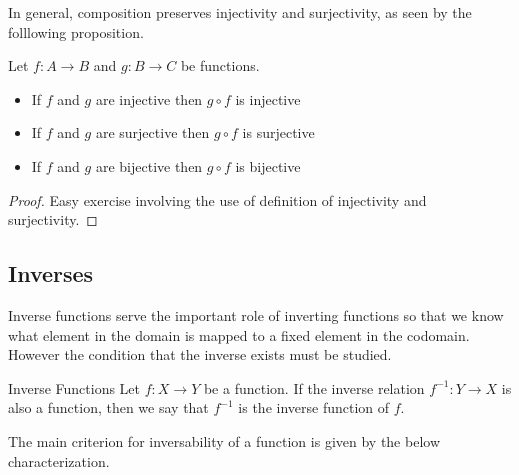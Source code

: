 \documentclass[a4paper]{article}
\begin{document}
In general, composition preserves injectivity and surjectivity, as seen by the folllowing proposition. 

\begin{prp}{}{} Let $f:A\to B$ and $g:B\to C$ be functions. 
\begin{itemize}
\item If $f$ and $g$ are injective then $g\circ f$ is injective
\item If $f$ and $g$ are surjective then $g\circ f$ is surjective
\item If $f$ and $g$ are bijective then $g\circ f$ is bijective
\end{itemize}\tcbline
\begin{proof}
Easy exercise involving the use of definition of injectivity and surjectivity. 
\end{proof}
\end{prp}

\subsection{Inverses}
Inverse functions serve the important role of inverting functions so that we know what element in the domain is mapped to a fixed element in the codomain. However the condition that the inverse exists must be studied. 

\begin{defn}{Inverse Functions}{} Let $f:X\to Y$ be a function. If the inverse relation $f^{-1}:Y\to X$ is also a function, then we say that $f^{-1}$ is the inverse function of $f$. 
\end{defn}

The main criterion for inversability of a function is given by the below characterization. 
\end{document}
